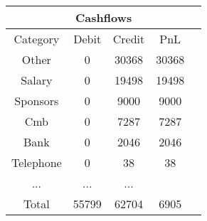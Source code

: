 \begin{longtable}{|c|c|c|c|c|}
\hline
\multicolumn{5}{|c|}{Cashflows} \\
\hline
Category & Debit & Credit & PnL \\
\hline
Other & 0 & 30368 & 30368\\
\hline
Salary & 0 & 19498 & 19498\\
\hline
Sponsors & 0 & 9000 & 9000\\
\hline
Cmb & 0 & 7287 & 7287\\
\hline
Bank & 0 & 2046 & 2046\\
\hline
Telephone & 0 & 38 & 38\\
\hline
 ... & ... & ...\\
\hline
 Total & 55799 & 62704 & 6905 \\
\hline
\end{longtable}
